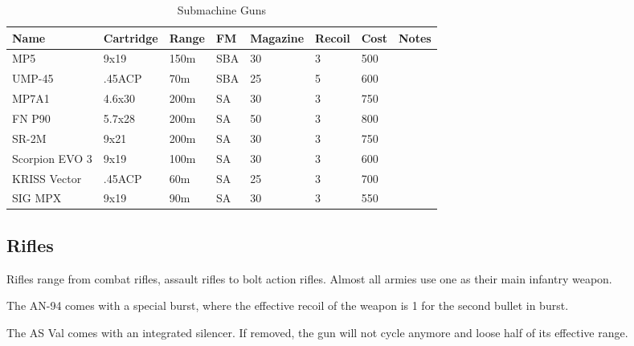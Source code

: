 \begin{table}
  \caption{Submachine Guns}
  \begin{center}
    \begin{tabular}{| l | l | l | l | l | l | l | l |}
      \hline
      \textbf{Name} & \textbf{Cartridge} & \textbf{Range} &
      \textbf{FM} & \textbf{Magazine} & \textbf{Recoil} &
      \textbf{Cost} & \textbf{Notes} \\ \hline

      MP5            & 9x19   & 150m & SBA & 30 & 3 & 500 & \\ \hline
      UMP-45         & .45ACP &  70m & SBA & 25 & 5 & 600 & \\ \hline
      MP7A1          & 4.6x30 & 200m & SA  & 30 & 3 & 750 & \\ \hline
      FN P90         & 5.7x28 & 200m & SA  & 50 & 3 & 800 & \\ \hline
      SR-2M          & 9x21   & 200m & SA  & 30 & 3 & 750 & \\ \hline
      Scorpion EVO 3 & 9x19   & 100m & SA  & 30 & 3 & 600 & \\ \hline
      KRISS Vector   & .45ACP &  60m & SA  & 25 & 3 & 700 & \\ \hline
      SIG MPX        & 9x19   &  90m & SA  & 30 & 3 & 550 & \\ \hline

    \end{tabular}
  \end{center}
\end{table}

\subsection{Rifles}

Rifles range from combat rifles, assault rifles to bolt action rifles. Almost
all armies use one as their main infantry weapon.

The AN-94 comes with a special burst, where the effective recoil of the weapon
is 1 for the second bullet in burst.

The AS Val comes with an integrated silencer. If removed, the gun will not
cycle anymore and loose half of its effective range.

